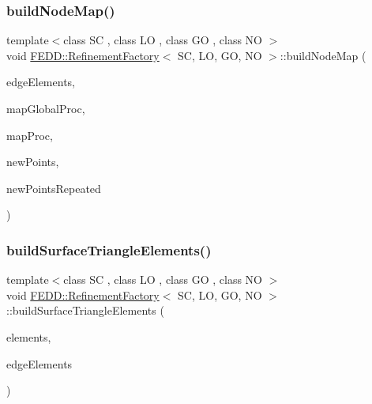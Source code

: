 \mbox{\label{classFEDD_1_1RefinementFactory_abeca9755a1bd393c36c792a78c6779e9}} 
\subsubsection{\texorpdfstring{build\+Node\+Map()}{buildNodeMap()}}
{\footnotesize\ttfamily template$<$class SC , class LO , class GO , class NO $>$ \\
void \hyperlink{classFEDD_1_1RefinementFactory}{F\+E\+D\+D\+::\+Refinement\+Factory}$<$ SC, LO, GO, NO $>$\+::build\+Node\+Map (\begin{DoxyParamCaption}\item[{\hyperlink{classFEDD_1_1RefinementFactory_ae5285e990ec4632d6188a1280627ad13}{Edge\+Elements\+Ptr\+\_\+\+Type}}]{edge\+Elements,  }\item[{\hyperlink{classFEDD_1_1RefinementFactory_a8256ccdf1b2a5c977ddc011f4e8eb8d3}{Map\+Const\+Ptr\+\_\+\+Type}}]{map\+Global\+Proc,  }\item[{\hyperlink{classFEDD_1_1RefinementFactory_a8256ccdf1b2a5c977ddc011f4e8eb8d3}{Map\+Const\+Ptr\+\_\+\+Type}}]{map\+Proc,  }\item[{int}]{new\+Points,  }\item[{int}]{new\+Points\+Repeated }\end{DoxyParamCaption})}

\mbox{\label{classFEDD_1_1RefinementFactory_acc422779a3cf6ca5a4c916acf7708418}} 
\subsubsection{\texorpdfstring{build\+Surface\+Triangle\+Elements()}{buildSurfaceTriangleElements()}}
{\footnotesize\ttfamily template$<$class SC , class LO , class GO , class NO $>$ \\
void \hyperlink{classFEDD_1_1RefinementFactory}{F\+E\+D\+D\+::\+Refinement\+Factory}$<$ SC, LO, GO, NO $>$\+::build\+Surface\+Triangle\+Elements (\begin{DoxyParamCaption}\item[{\hyperlink{classFEDD_1_1RefinementFactory_a0994b5b7b6d080048673941251999f2e}{Elements\+Ptr\+\_\+\+Type}}]{elements,  }\item[{\hyperlink{classFEDD_1_1RefinementFactory_ae5285e990ec4632d6188a1280627ad13}{Edge\+Elements\+Ptr\+\_\+\+Type}}]{edge\+Elements }\end{DoxyParamCaption})}

